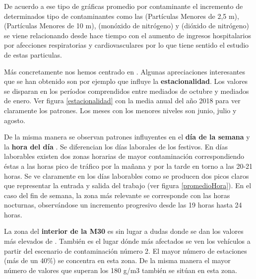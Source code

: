 
De acuerdo a ese tipo de gráficas promedio por contaminante el incremento de determinados tipo de contaminantes como las  (Partículas Menores de 2,5 \textmugreek m),  (Partículas Menores de 10 \textmugreek m),  (monóxido de nitrógeno) y  (dióxido de nitrógeno) se viene relacionando desde hace tiempo con el aumento de ingresos hospitalarios por afecciones respiratorias y cardiovasculares por lo que tiene sentido el estudio de estas particulas.

Más concretamente nos hemos centrado en . Algunas apreciaciones interesantes que se han obtenido son por ejemplo que influye la \textbf{estacionalidad}. Los valores se disparan en los períodos comprendidos entre mediados de octubre y mediados de enero. Ver figura \ref{estacionalidad} con la media anual del año 2018 para ver claramente los patrones. Los meses con los menores niveles son junio, julio y agosto. 


De la misma manera se observan patrones influyentes en el \textbf{día de la semana} y la \textbf{hora del día} . Se diferencian los días laborales de los festivos.  En días laborables existen dos zonas horarias de mayor contaminación correspondiendo éstas a las horas pico de tráfico por la mañana y por la tarde en torno a las 20-21 horas.  Se ve claramente en los días laborables como se producen dos picos claros que representar la entrada y salida del trabajo (ver figura \ref{promedioHora}).  En el caso del fin de semana, la zona más relevante se corresponde con las horas nocturnas, observándose un incremento progresivo desde las 19 horas hasta 24 horas. 

	


La zona del \textbf{interior de la M30} es sin lugar a dudas donde se dan los valores más elevados de . También es el lugar dónde más afectados se ven los vehículos a partir del escenario de contaminación número 2. El mayor número de estaciones (más de un 40\%) se concentra en esta zona. De la misma manera el mayor número de valores que superan los 180 \textmugreek g/m3 también se sitúan en esta zona.

